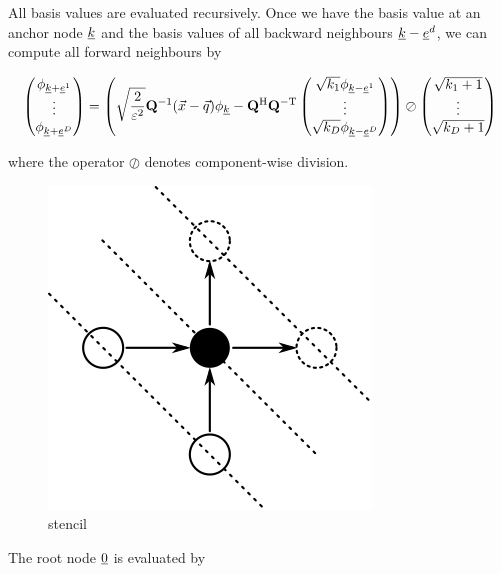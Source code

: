 \documentclass{article}
\begin{document}
All basis values are evaluated recursively. Once we have the basis
value at an anchor node $\underline{k}$ and the basis values of all
backward neighbours $\underline{k}-\underline{e}^d$, we can compute all
forward neighbours by

\begin{equation}
  \begin{pmatrix}
    \phi_{\underline{k}+\underline{e}^1} \\
    \vdots \\
    \phi_{\underline{k}+\underline{e}^D}
  \end{pmatrix}
  = \left(
    \sqrt{\frac{2}{\varepsilon^2}} \mathbf{Q}^\mathrm{-1} (\vec{x}-\vec{q}) \phi_{\underline{k}}
    - \mathbf{Q}^\mathrm{H} \mathbf{Q}^\mathrm{-T}
    \begin{pmatrix}
      \sqrt{k_1} \phi_{\underline{k}-\underline{e}^1} \\
      \vdots \\
      \sqrt{k_D} \phi_{\underline{k}-\underline{e}^D}
    \end{pmatrix}
  \right)
  \oslash
  \begin{pmatrix}
    \sqrt{k_1+1}\\
    \vdots \\
    \sqrt{k_D+1}
  \end{pmatrix}
\end{equation}

where the operator $\oslash$ denotes component-wise division.

\begin{figure}[H]
  \centering
  \includegraphics[]{basis_eval_stencil}
  \caption{stencil}
\end{figure}

The root node $\underline{0}$ is evaluated by
\end{document}
